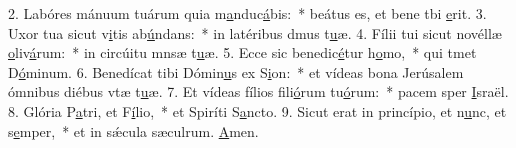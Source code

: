 2. Labóres mánuum tuárum quia m\uline{a}nduc\uline{á}bis:~* beátus es, et bene tbi \uline{e}rit.
3. Uxor tua sicut v\uline{i}tis ab\uline{ú}ndans:~* in latéribus dmus t\uline{u}æ.
4. Fílii tui sicut novéllæ \uline{o}liv\uline{á}rum:~* in circúitu mnsæ t\uline{u}æ.
5. Ecce sic benedic\uline{é}tur h\uline{o}mo,~* qui tmet D\uline{ó}minum.
6. Benedícat tibi Dómin\uline{u}s ex S\uline{i}on:~* et vídeas bona Jerúsalem ómnibus diébus vtæ t\uline{u}æ.
7. Et vídeas fílios fili\uline{ó}rum tu\uline{ó}rum:~* pacem sper \uline{I}sraël.
8. Glória P\uline{a}tri, et F\uline{í}lio,~* et Spiríti S\uline{a}ncto.
9. Sicut erat in princípio, et n\uline{u}nc, et s\uline{e}mper,~* et in sǽcula sæculrum. \uline{A}men.
